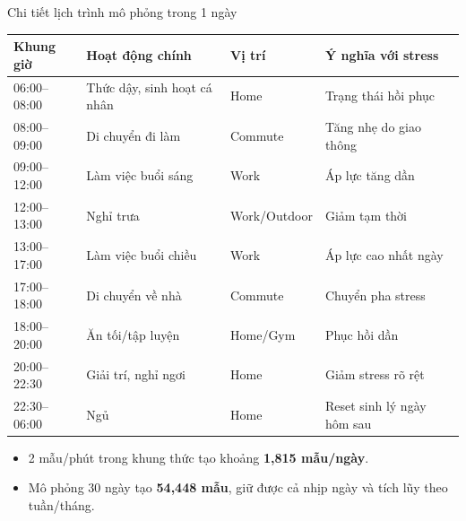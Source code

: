 \documentclass[11pt]{beamer}
\begin{document}
\begin{frame}{Chi tiết lịch trình mô phỏng trong 1 ngày}
\small
\begin{table}[h]
\centering
\scriptsize
\begin{tabular}{p{1.8cm}p{2.8cm}p{1.7cm}p{2.7cm}}
\toprule
\textbf{Khung giờ} & \textbf{Hoạt động chính} & \textbf{Vị trí} & \textbf{Ý nghĩa với stress} \\
\midrule
06:00--08:00 & Thức dậy, sinh hoạt cá nhân & Home & Trạng thái hồi phục \\
08:00--09:00 & Di chuyển đi làm & Commute & Tăng nhẹ do giao thông \\
09:00--12:00 & Làm việc buổi sáng & Work & Áp lực tăng dần \\
12:00--13:00 & Nghỉ trưa & Work/Outdoor & Giảm tạm thời \\
13:00--17:00 & Làm việc buổi chiều & Work & Áp lực cao nhất ngày \\
17:00--18:00 & Di chuyển về nhà & Commute & Chuyển pha stress \\
18:00--20:00 & Ăn tối/tập luyện & Home/Gym & Phục hồi dần \\
20:00--22:30 & Giải trí, nghỉ ngơi & Home & Giảm stress rõ rệt \\
22:30--06:00 & Ngủ & Home & Reset sinh lý ngày hôm sau \\
\bottomrule
\end{tabular}
\end{table}

\vspace{0.05cm}
\begin{itemize}
    \item 2 mẫu/phút trong khung thức tạo khoảng \textbf{1,815 mẫu/ngày}.
    \item Mô phỏng 30 ngày tạo \textbf{54,448 mẫu}, giữ được cả nhịp ngày và tích lũy theo tuần/tháng.
\end{itemize}
\end{frame}
\end{document}

